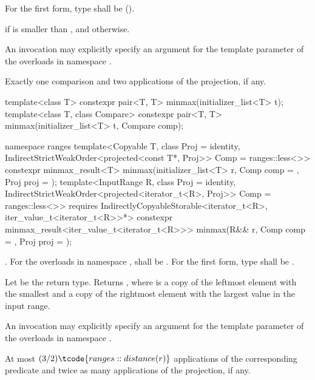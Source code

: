 \begin{itemdescr}
\pnum
\requires
For the first form, type  shall be
 ().

\pnum
\returns
{} if  is smaller than , and
 otherwise.

\pnum
\remarks
An invocation may explicitly specify
an argument for the template parameter 
of the overloads in namespace .

\pnum
\complexity
Exactly one comparison and two applications of the projection, if any.
\end{itemdescr}

%
\begin{itemdecl}
template<class T>
  constexpr pair<T, T> minmax(initializer_list<T> t);
template<class T, class Compare>
  constexpr pair<T, T> minmax(initializer_list<T> t, Compare comp);

namespace ranges {
  template<Copyable T, class Proj = identity,
           IndirectStrictWeakOrder<projected<const T*, Proj>> Comp = ranges::less<>>
    constexpr minmax_result<T>
      minmax(initializer_list<T> r, Comp comp = {}, Proj proj = {});
  template<InputRange R, class Proj = identity,
           IndirectStrictWeakOrder<projected<iterator_t<R>, Proj>> Comp = ranges::less<>>
    requires IndirectlyCopyableStorable<iterator_t<R>, iter_value_t<iterator_t<R>>*>
    constexpr minmax_result<iter_value_t<iterator_t<R>>>
      minmax(R&& r, Comp comp = {}, Proj proj = {});
}
\end{itemdecl}

\begin{itemdescr}
\pnum
\requires
{}.
For the overloads in namespace ,
 shall be .
For the first form, type  shall be .

\pnum
\returns
Let  be the return type.
Returns ,
where  is a copy of the leftmost element with the smallest and
 a copy of the rightmost element with the largest value
in the input range.

\pnum
\remarks
An invocation may explicitly specify
an argument for the template parameter 
of the overloads in namespace .

\pnum
\complexity
At most $(3/2)\tcode{ranges::distance(r)}$ applications
of the corresponding predicate
and twice as many applications of the projection, if any.
\end{itemdescr}


